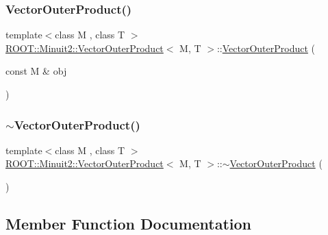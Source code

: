 \subsubsection{\texorpdfstring{VectorOuterProduct()}{VectorOuterProduct()}\hspace{0.1cm}{\footnotesize\ttfamily [3/3]}}
{\footnotesize\ttfamily template$<$class M , class T $>$ \\
\mbox{\hyperlink{classROOT_1_1Minuit2_1_1VectorOuterProduct}{R\+O\+O\+T\+::\+Minuit2\+::\+Vector\+Outer\+Product}}$<$ M, T $>$\+::\mbox{\hyperlink{classROOT_1_1Minuit2_1_1VectorOuterProduct}{Vector\+Outer\+Product}} (\begin{DoxyParamCaption}\item[{const M \&}]{obj }\end{DoxyParamCaption})\hspace{0.3cm}{\ttfamily [inline]}}

\mbox{\label{classROOT_1_1Minuit2_1_1VectorOuterProduct_a866532a01279d52fad9ad3a925eb9660}} 
\subsubsection{\texorpdfstring{$\sim$VectorOuterProduct()}{~VectorOuterProduct()}\hspace{0.1cm}{\footnotesize\ttfamily [3/3]}}
{\footnotesize\ttfamily template$<$class M , class T $>$ \\
\mbox{\hyperlink{classROOT_1_1Minuit2_1_1VectorOuterProduct}{R\+O\+O\+T\+::\+Minuit2\+::\+Vector\+Outer\+Product}}$<$ M, T $>$\+::$\sim$\mbox{\hyperlink{classROOT_1_1Minuit2_1_1VectorOuterProduct}{Vector\+Outer\+Product}} (\begin{DoxyParamCaption}{ }\end{DoxyParamCaption})\hspace{0.3cm}{\ttfamily [inline]}}



\subsection{Member Function Documentation}
\mbox{\label{classROOT_1_1Minuit2_1_1VectorOuterProduct_a9326f6e70b3760159b6b74dded8311d3}} 
